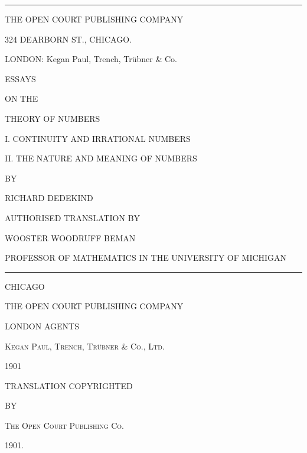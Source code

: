 \documentclass[oneside]{book}
\begin{document}
\begin{center}
\smallskip
\rule[.5ex]{2cm}{.2pt}

\medskip
THE OPEN COURT PUBLISHING COMPANY

{\scriptsize 324 DEARBORN ST., CHICAGO.}

{\small LONDON: Kegan Paul, Trench, Trübner \& Co.}
\end{center}

\newpage
\begin{center}
{\huge ESSAYS}

\vspace{0.1in}

{\footnotesize ON THE}

\vspace{0.1in}

{\huge THEORY OF NUMBERS}

\vspace{0.5in}

I\@. CONTINUITY AND IRRATIONAL NUMBERS

\smallskip
II\@. THE NATURE AND MEANING OF NUMBERS

\vspace{0.5in}

{\footnotesize BY }

\smallskip
{\large RICHARD DEDEKIND}

\vspace{0.5in}

{\footnotesize AUTHORISED TRANSLATION BY}

\smallskip
WOOSTER WOODRUFF BEMAN

\smallskip
{\footnotesize PROFESSOR OF MATHEMATICS IN THE UNIVERSITY OF MICHIGAN}

\vfill
\rule[.5ex]{3cm}{1pt}
\vfill

{\large CHICAGO}

THE OPEN COURT PUBLISHING COMPANY
\smallskip

{\footnotesize LONDON AGENTS}

{\footnotesize \textsc{Kegan Paul, Trench, Trübner \& Co., Ltd.}}

1901
\end{center}

\newpage

\begin{center}
TRANSLATION COPYRIGHTED
\smallskip

BY
\smallskip

\textsc{The Open Court Publishing Co.}

1901.
\end{center}
\end{document}
